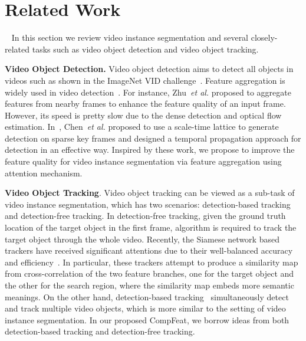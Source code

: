 \documentclass[letterpaper]{article} \usepackage{aaai21}  \usepackage{times}  \usepackage{helvet} \usepackage{courier}  \usepackage[hyphens]{url}  \usepackage{graphicx} \urlstyle{rm} \def\UrlFont{\rm}  \usepackage{natbib}  \usepackage{caption} \frenchspacing  \setlength{\pdfpagewidth}{8.5in}  \setlength{\pdfpageheight}{11in}  \newcommand{\etal}{\emph{et al. }}
\begin{document}
%
 \section{Related Work}~\label{related}
In this section we review  video instance segmentation and several closely-related tasks such as video object detection and video object tracking.





{\bf Video Object Detection.} Video object detection aims to detect all objects in videos such as shown in the ImageNet VID challenge~\cite{russakovsky2015imagenet,han2016seq}. Feature aggregation is widely used in video detection~\cite{zhu2017flow,feichtenhofer2017detect,chen2018optimizing,liu2019looking}. For instance, Zhu~\etal proposed to aggregate features from nearby frames to enhance the feature quality of an input frame. However, its speed is pretty slow due to the dense detection and optical flow estimation. In~\cite{chen2018optimizing}, Chen~\etal proposed to use a scale-time lattice to generate detection on sparse key frames and designed a temporal propagation approach for detection in an effective way. Inspired by these work, we propose to improve the feature quality for video instance segmentation via feature aggregation using attention mechanism.

{\bf Video Object Tracking}. Video object tracking can be viewed as a sub-task of video instance segmentation, which has two scenarios: detection-based tracking and detection-free tracking. In detection-free tracking, given the ground truth location of the target object in the first frame, algorithm is required to track the target object through the whole video. Recently, the Siamese network based trackers have received significant attentions due to their well-balanced accuracy and efficiency~\cite{li2019siamrpn++, zhang2019deeper, wang2018learning, valmadre2017end}. In particular, these trackers attempt to produce a similarity map from cross-correlation of the two feature branches, one for the target object and the other for the search region, where the similarity map embeds more semantic meanings. On the other hand, detection-based tracking~\cite{sadeghian2017tracking, son2017multi,shi2018geometry} simultaneously detect and track multiple video objects, which is more similar to the setting of video instance segmentation. In our proposed CompFeat, we borrow ideas from both detection-based tracking and detection-free tracking.
\end{document}
